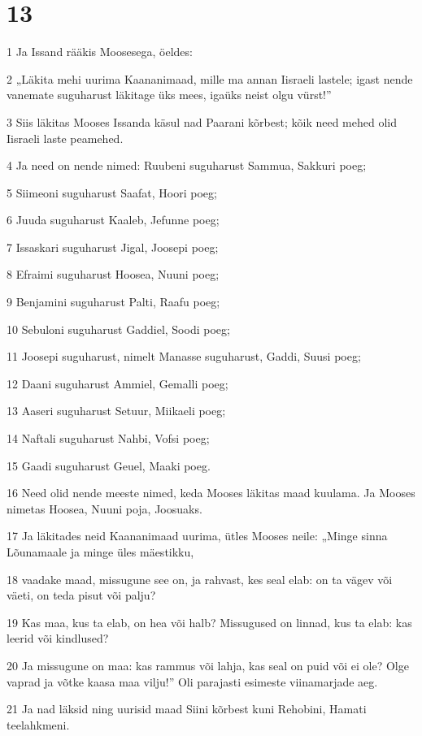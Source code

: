 \chapter{13}

\par 1 Ja Issand rääkis Moosesega, öeldes:
\par 2 „Läkita mehi uurima Kaananimaad, mille ma annan Iisraeli lastele; igast nende vanemate suguharust läkitage üks mees, igaüks neist olgu vürst!”
\par 3 Siis läkitas Mooses Issanda käsul nad Paarani kõrbest; kõik need mehed olid Iisraeli laste peamehed.
\par 4 Ja need on nende nimed: Ruubeni suguharust Sammua, Sakkuri poeg;
\par 5 Siimeoni suguharust Saafat, Hoori poeg;
\par 6 Juuda suguharust Kaaleb, Jefunne poeg;
\par 7 Issaskari suguharust Jigal, Joosepi poeg;
\par 8 Efraimi suguharust Hoosea, Nuuni poeg;
\par 9 Benjamini suguharust Palti, Raafu poeg;
\par 10 Sebuloni suguharust Gaddiel, Soodi poeg;
\par 11 Joosepi suguharust, nimelt Manasse suguharust, Gaddi, Suusi poeg;
\par 12 Daani suguharust Ammiel, Gemalli poeg;
\par 13 Aaseri suguharust Setuur, Miikaeli poeg;
\par 14 Naftali suguharust Nahbi, Vofsi poeg;
\par 15 Gaadi suguharust Geuel, Maaki poeg.
\par 16 Need olid nende meeste nimed, keda Mooses läkitas maad kuulama. Ja Mooses nimetas Hoosea, Nuuni poja, Joosuaks.
\par 17 Ja läkitades neid Kaananimaad uurima, ütles Mooses neile: „Minge sinna Lõunamaale ja minge üles mäestikku,
\par 18 vaadake maad, missugune see on, ja rahvast, kes seal elab: on ta vägev või väeti, on teda pisut või palju?
\par 19 Kas maa, kus ta elab, on hea või halb? Missugused on linnad, kus ta elab: kas leerid või kindlused?
\par 20 Ja missugune on maa: kas rammus või lahja, kas seal on puid või ei ole? Olge vaprad ja võtke kaasa maa vilju!” Oli parajasti esimeste viinamarjade aeg.
\par 21 Ja nad läksid ning uurisid maad Siini kõrbest kuni Rehobini, Hamati teelahkmeni.
